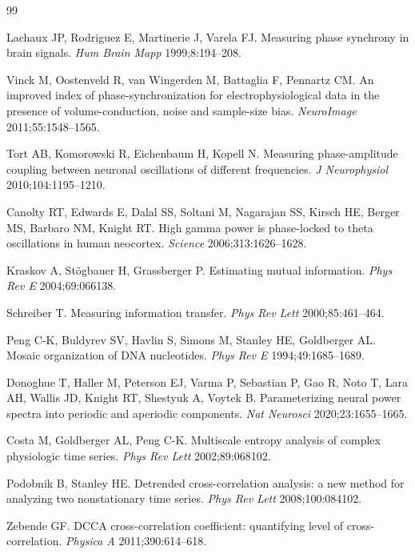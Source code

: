 \documentclass[11pt,a4paper]{article}
\begin{document}

\begin{thebibliography}{99}

Lachaux JP, Rodriguez E, Martinerie J, Varela FJ.
Measuring phase synchrony in brain signals.
\emph{Hum Brain Mapp} 1999;8:194--208.

Vinck M, Oostenveld R, van Wingerden M, Battaglia F, Pennartz CM.
An improved index of phase-synchronization for electrophysiological data
in the presence of volume-conduction, noise and sample-size bias.
\emph{NeuroImage} 2011;55:1548--1565.

Tort AB, Komorowski R, Eichenbaum H, Kopell N.
Measuring phase-amplitude coupling between neuronal oscillations of
different frequencies. \emph{J Neurophysiol} 2010;104:1195--1210.

Canolty RT, Edwards E, Dalal SS, Soltani M, Nagarajan SS, Kirsch HE,
Berger MS, Barbaro NM, Knight RT.
High gamma power is phase-locked to theta oscillations in human
neocortex. \emph{Science} 2006;313:1626--1628.

Kraskov A, St\"ogbauer H, Grassberger P.
Estimating mutual information.
\emph{Phys Rev E} 2004;69:066138.

Schreiber T.
Measuring information transfer.
\emph{Phys Rev Lett} 2000;85:461--464.

Peng C-K, Buldyrev SV, Havlin S, Simons M, Stanley HE, Goldberger AL.
Mosaic organization of DNA nucleotides.
\emph{Phys Rev E} 1994;49:1685--1689.

Donoghue T, Haller M, Peterson EJ, Varma P, Sebastian P, Gao R,
Noto T, Lara AH, Wallis JD, Knight RT, Shestyuk A, Voytek B.
Parameterizing neural power spectra into periodic and aperiodic
components. \emph{Nat Neurosci} 2020;23:1655--1665.

Costa M, Goldberger AL, Peng C-K.
Multiscale entropy analysis of complex physiologic time series.
\emph{Phys Rev Lett} 2002;89:068102.

Podobnik B, Stanley HE.
Detrended cross-correlation analysis: a new method for analyzing two
nonstationary time series.
\emph{Phys Rev Lett} 2008;100:084102.

Zebende GF.
DCCA cross-correlation coefficient: quantifying level of
cross-correlation. \emph{Physica A} 2011;390:614--618.


\end{thebibliography}
\end{document}
